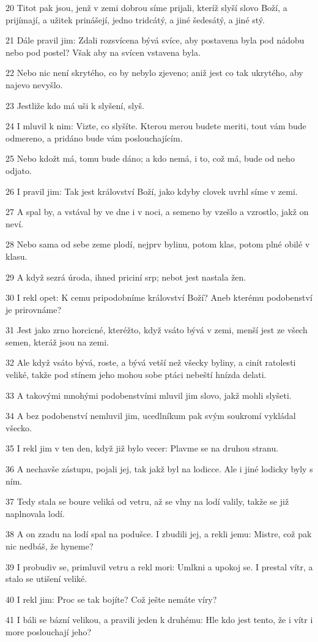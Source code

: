 \par 20 Titot pak jsou, jenž v zemi dobrou síme prijali, kteríž slyší slovo Boží, a prijímají, a užitek prinášejí, jedno tridcátý, a jiné šedesátý, a jiné stý.
\par 21 Dále pravil jim: Zdali rozsvícena bývá svíce, aby postavena byla pod nádobu nebo pod postel? Však aby na svícen vstavena byla.
\par 22 Nebo nic není skrytého, co by nebylo zjeveno; aniž jest co tak ukrytého, aby najevo nevyšlo.
\par 23 Jestliže kdo má uši k slyšení, slyš.
\par 24 I mluvil k nim: Vizte, co slyšíte. Kterou merou budete meriti, tout vám bude odmereno, a pridáno bude vám poslouchajícím.
\par 25 Nebo kdožt má, tomu bude dáno; a kdo nemá, i to, což má, bude od neho odjato.
\par 26 I pravil jim: Tak jest království Boží, jako kdyby clovek uvrhl síme v zemi.
\par 27 A spal by, a vstával by ve dne i v noci, a semeno by vzešlo a vzrostlo, jakž on neví.
\par 28 Nebo sama od sebe zeme plodí, nejprv bylinu, potom klas, potom plné obilé v klasu.
\par 29 A když sezrá úroda, ihned priciní srp; nebot jest nastala žen.
\par 30 I rekl opet: K cemu pripodobníme království Boží? Aneb kterému podobenství je prirovnáme?
\par 31 Jest jako zrno horcicné, kteréžto, když vsáto bývá v zemi, menší jest ze všech semen, kteráž jsou na zemi.
\par 32 Ale když vsáto bývá, roste, a bývá vetší než všecky byliny, a cinít ratolesti veliké, takže pod stínem jeho mohou sobe ptáci nebeští hnízda delati.
\par 33 A takovými mnohými podobenstvími mluvil jim slovo, jakž mohli slyšeti.
\par 34 A bez podobenství nemluvil jim, ucedlníkum pak svým soukromí vykládal všecko.
\par 35 I rekl jim v ten den, když již bylo vecer: Plavme se na druhou stranu.
\par 36 A nechavše zástupu, pojali jej, tak jakž byl na lodicce. Ale i jiné lodicky byly s ním.
\par 37 Tedy stala se boure veliká od vetru, až se vlny na lodí valily, takže se již naplnovala lodí.
\par 38 A on zzadu na lodí spal na podušce. I zbudili jej, a rekli jemu: Mistre, což pak nic nedbáš, že hyneme?
\par 39 I probudiv se, primluvil vetru a rekl mori: Umlkni a upokoj se. I prestal vítr, a stalo se utišení veliké.
\par 40 I rekl jim: Proc se tak bojíte? Což ješte nemáte víry?
\par 41 I báli se bázní velikou, a pravili jeden k druhému: Hle kdo jest tento, že i vítr i more poslouchají jeho?

